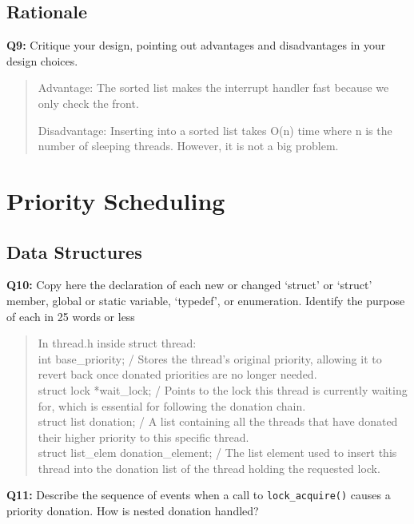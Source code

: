 \documentclass[a4paper,11pt]{paper}
\begin{document}
\subsection{Rationale}

\textbf{Q9:} Critique your design, pointing out advantages and disadvantages in
your design choices.

\begin{quote}
Advantage: The sorted list makes the interrupt handler fast because we only check the front.

Disadvantage: Inserting into a sorted list takes O(n) time where n is the number of sleeping threads. 
However, it is not a big problem.
\end{quote}



\section{Priority Scheduling}

\subsection{Data Structures}

\textbf{Q10:} Copy here the declaration of each new or changed `struct' or
`struct' member, global or static variable, `typedef', or enumeration.  Identify
the purpose of each in 25 words or less


\begin{quote}
In thread.h inside struct thread:\\
  int base\_priority; / Stores the thread's original priority, allowing it to revert back once donated priorities are no longer needed.\\
  struct lock *wait\_lock; / Points to the lock this thread is currently waiting for, which is essential for following the donation chain.\\
  struct list donation; / A list containing all the threads that have donated their higher priority to this specific thread.\\
  struct list\_elem donation\_element; / The list element used to insert this thread into the donation list of the thread holding the requested lock.
\end{quote}

\textbf{Q11:} Describe the sequence of events when a call to
\texttt{lock\_acquire()} causes a priority donation.  How is nested donation
handled?
\end{document}

